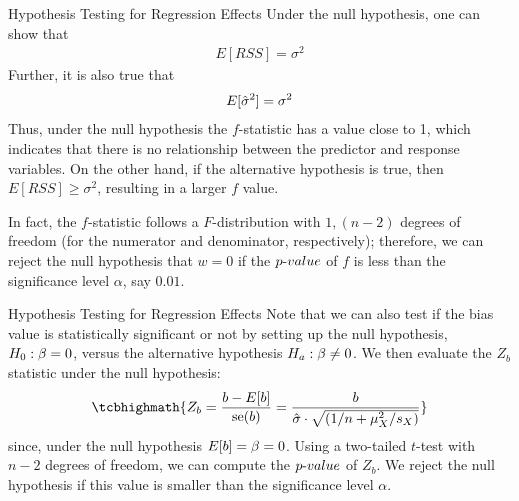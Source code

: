 \begin{frame}{Hypothesis Testing for Regression Effects}
Under the null hypothesis, one can show that 
\begin{align*}
    E[RSS] = \sigma^2
\end{align*}
Further, it is also true that
\begin{align*}
    E[\hat{\sigma}^2] = \sigma^2
\end{align*}
Thus, under the null hypothesis the $f$-statistic has a value close to
1, which indicates that there is no relationship between the predictor
and response variables. On the other hand, if the alternative hypothesis
is true, then $E[RSS] \ge \sigma^2$, resulting in a larger $f$ value.

\medskip

In fact, the $f$-statistic follows a $F$-distribution with $1,(n-2)$ degrees of
freedom (for the numerator and denominator, respectively); therefore, we can reject the null hypothesis that $w = 0$ if
the ${p\text{-}value}$ of $f$ is less than the significance level $\alpha$, say $0.01$.
\end{frame}
%
%
%
%
\begin{frame}{Hypothesis Testing for Regression Effects}
Note that we can also test if the bias value is statistically
significant or not by setting up the null hypothesis, $H_0: \beta=0$, versus
the alternative hypothesis $H_a: \beta\ne 0$. We then evaluate the
$Z_{b}$ statistic %
under the null
hypothesis:
\begin{align}
    \tcbhighmath{
    Z_{b} = \frac{b - E[b]}{\se(b)} =
\frac{b}{\hsigma\cdot \sqrt{(1/n + \mu_X^2/s_X)}} }
\end{align}
since, under the null hypothesis $E[b] = \beta = 0$.
Using a two-tailed $t$-test with $n-2$ degrees of freedom, we can
compute the ${p\text{-}value}$ of $Z_{b}$. We reject the null hypothesis if
this value is smaller than the significance level $\alpha$.
\end{frame}
